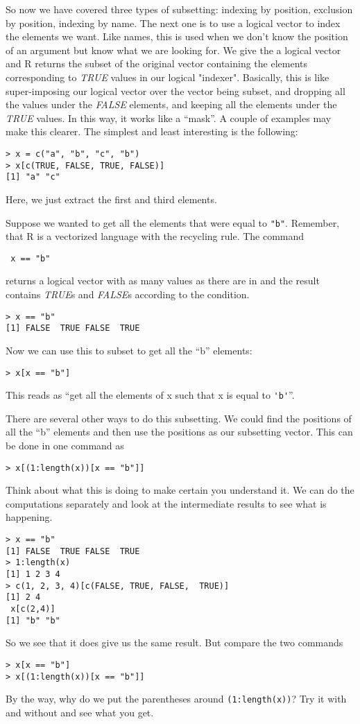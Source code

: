 So now we have covered three types of subsetting: indexing by
position, exclusion by position, indexing by name. The next one is to
use a logical vector to index the elements we want. Like names, this
is used when we don't know the position of an argument but know what
we are looking for. We give the \SOperator{[} a logical vector and R
returns the subset of the original vector containing the elements
corresponding to \textsl{TRUE} values in our logical
"indexer". Basically, this is like super-imposing our logical vector
over the vector being subset, and dropping all the values under the
\textsl{FALSE} elements, and keeping all the elements under the
\textsl{TRUE} values. In this way, it works like a ``mask''. A couple of
examples may make this clearer. The simplest and least interesting is
the following:
\begin{verbatim}
> x = c("a", "b", "c", "b")
> x[c(TRUE, FALSE, TRUE, FALSE)]
[1] "a" "c"
\end{verbatim}
Here, we just extract the first and third elements. 

Suppose we wanted to get all the elements that were equal to
\verb+"b"+. Remember, that R is a vectorized language with the recycling
rule. The command
\begin{verbatim}
 x == "b"
\end{verbatim}
returns a logical vector with as many values as there are in
 and the result contains \textsl{TRUE}s and
\textsl{FALSE}s according to the condition.
\begin{verbatim}
> x == "b"
[1] FALSE  TRUE FALSE  TRUE
\end{verbatim}
Now we can use this to subset  to get all the ``b''
elements:
\begin{verbatim}
> x[x == "b"]
\end{verbatim}
This reads as ``get all the elements of x such that x is equal to \verb+'b'+''.

There are several other ways to do this subsetting. We could find the
positions of all the ``b'' elements and then use the positions as our
subsetting vector. This can be done in one command as
\begin{verbatim}
> x[(1:length(x))[x == "b"]]
\end{verbatim}
Think about what this is doing to make certain you understand it. We
can do the computations separately and look at the intermediate
results to see what is happening.
\begin{verbatim}
> x == "b"
[1] FALSE  TRUE FALSE  TRUE
> 1:length(x)
[1] 1 2 3 4
> c(1, 2, 3, 4)[c(FALSE, TRUE, FALSE,  TRUE)]
[1] 2 4
 x[c(2,4)]
[1] "b" "b"
\end{verbatim}
So we see that it does give us the same result. But compare the two
commands
\begin{verbatim}
> x[x == "b"]
> x[(1:length(x))[x == "b"]]
\end{verbatim}
By the way, why do we put the parentheses around \verb|(1:length(x))|?
Try it with and without and see what you get.

